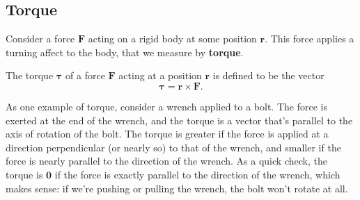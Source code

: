 \documentclass[10pt,]{book}
\newcommand{\terminology}[1]{\textbf{#1}}
\theoremstyle{ptxplainnotitle}
\theoremstyle{ptxplaintitle}
\theoremstyle{ptxplainnotitle}
\theoremstyle{ptxplaintitle}
\theoremstyle{ptxplainnotitle}
\theoremstyle{ptxplaintitle}
\theoremstyle{ptxdefinitionnotitle}
\theoremstyle{ptxdefinitiontitle}
\theoremstyle{ptxdefinitionnotitle}
\theoremstyle{ptxdefinitiontitle}
\theoremstyle{ptxdefinitionnotitle}
\theoremstyle{ptxdefinitiontitle}
\theoremstyle{ptxdefinitionnotitle}
\theoremstyle{ptxdefinitiontitle}
\theoremstyle{ptxdefinitionnotitle}
\theoremstyle{ptxdefinitiontitle}
\numberwithin{equation}{section}
\newcommand{\vv}[1]{\mathbf{#1}}
\begin{document}
\subsection[{Torque}]{Torque}\label{subsection-torque}
\hypertarget{p-848}{}%
Consider a force \(\vv{F}\) acting on a rigid body at some position \(\vv{r}\). This force applies a turning affect to the body, that we measure by \terminology{torque}.%
\begin{definition}[{Torque.}]\label{definition-torque}
\hypertarget{p-849}{}%
The torque \(\boldsymbol{\tau}\) of a force \(\vv{F}\) acting at a position \(\vv{r}\) is defined to be the vector%
%
\begin{equation*}
\boldsymbol{\tau} = \vv{r}\times\vv{F}.
\end{equation*}
\end{definition}
\hypertarget{p-850}{}%
As one example of torque, consider a wrench applied to a bolt. The force is exerted at the end of the wrench, and the torque is a vector that's parallel to the axis of rotation of the bolt. The torque is greater if the force is applied at a direction perpendicular (or nearly so) to that of the wrench, and smaller if the force is nearly parallel to the direction of the wrench. As a quick check, the torque is \(\vv{0}\) if the force is exactly parallel to the direction of the wrench, which makes sense: if we're pushing or pulling the wrench, the bolt won't rotate at all.%
\end{document}

